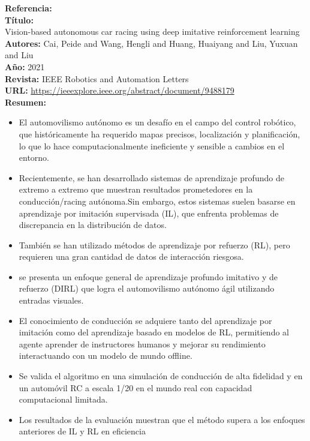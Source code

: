 \documentclass[10pt,letterpaper,final]{article}
\begin{document}
\begin{longtable}
        \hline
        \noindent \textbf{Referencia:}~\cite{cai2021vision} \\
        \textbf{Título:} \\
        Vision-based autonomous car racing using deep imitative reinforcement learning \\
        \textbf{Autores:}
        Cai, Peide and Wang, Hengli and Huang, Huaiyang and Liu, Yuxuan and Liu \\
        \textbf{Año:}
        2021 \\
        \textbf{Revista:}
        IEEE Robotics and Automation Letters \\
        \textbf{URL:}
        \url{https://ieeexplore.ieee.org/abstract/document/9488179} \\
        \textbf{Resumen:}
        \begin{itemize}
            \item El automovilismo autónomo es un desafío en el campo del control robótico, que históricamente ha requerido mapas precisos,
            localización y planificación, lo que lo hace computacionalmente ineficiente y sensible a cambios en el entorno.
            \item Recientemente, se han desarrollado sistemas de aprendizaje profundo de extremo a extremo que muestran resultados prometedores
            en la conducción/racing autónoma.Sin embargo, estos sistemas suelen basarse en aprendizaje por imitación supervisada (IL),
            que enfrenta problemas de discrepancia en la distribución de datos.
            \item También se han utilizado métodos de aprendizaje por refuerzo (RL), pero requieren una gran cantidad de datos de interacción riesgosa.
            \item se presenta un enfoque general de aprendizaje profundo imitativo y de refuerzo (DIRL) que logra el automovilismo
            autónomo ágil utilizando entradas visuales.
            \item El conocimiento de conducción se adquiere tanto del aprendizaje por imitación como del aprendizaje basado en modelos de RL,
            permitiendo al agente aprender de instructores humanos y mejorar su rendimiento interactuando con un modelo de mundo offline.
            \item Se valida el algoritmo en una simulación de conducción de alta fidelidad y en un automóvil RC a escala 1/20
            en el mundo real con capacidad computacional limitada.
            \item Los resultados de la evaluación muestran que el método supera a los enfoques anteriores de IL y RL en eficiencia

\end{itemize}
\end{longtable}
\end{document}
